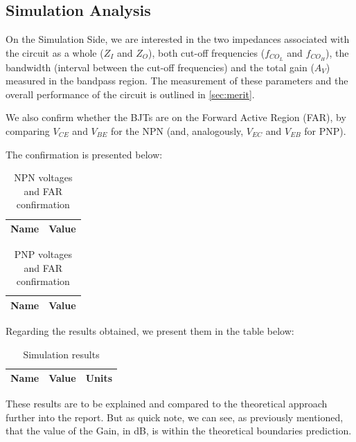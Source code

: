 \clearpage

\subsection{Simulation Analysis}
\label{subsec:Sim}

On the Simulation Side, we are interested in the two impedances associated with the circuit as a whole ($Z_I$ and $Z_O$), both cut-off frequencies ($f_{CO_L}$ and $f_{CO_H}$), the bandwidth (interval between the cut-off frequencies) and the total gain ($A_V$) measured in the bandpass region. The measurement of these parameters and the overall performance of the circuit is outlined in \ref{sec:merit}.

We also confirm whether the BJTs are on the Forward Active Region (FAR), by comparing $V_{CE}$ and $V_{BE}$ for the NPN (and, analogously, $V_{EC}$ and $V_{EB}$ for PNP). 

The confirmation is presented below:

\begin{table}[h]
    \centering
    \begin{tabular}{|c|c|}
    \hline
    {\bf Name} & {\bf Value} \\ \hline
    
    \end{tabular}
    \caption{NPN voltages and FAR confirmation}
    \label{tab:NPN}
\end{table}

\begin{table}[h]
    \centering
    \begin{tabular}{|c|c|}
    \hline
    {\bf Name} & {\bf Value} \\ \hline
    
    \end{tabular}
    \caption{PNP voltages and FAR confirmation}
    \label{tab:PNP}
\end{table}


Regarding the results obtained, we present them in the table below:

\begin{table}[h]
    \centering
    \begin{tabular}{|c|c|c|}
    \hline
    {\bf Name} & {\bf Value} & {\bf Units}\\ \hline
    
    \end{tabular}
    \caption{Simulation results}
    \label{tab:sim_results}
\end{table}

These results are to be explained and compared to the theoretical approach further into the report. But as quick note, we can see, as previously mentioned, that the value of the Gain, in dB, is within the theoretical boundaries prediction.


